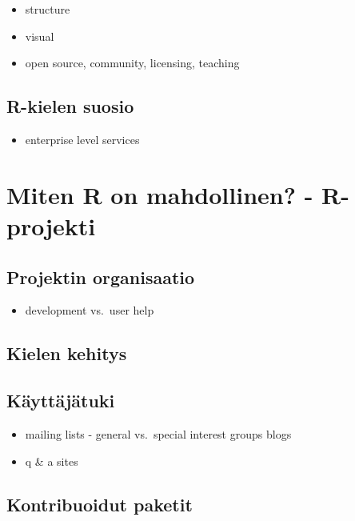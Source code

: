 \begin{itemize}
\itemsep1pt\parskip0pt
\item
  structure
\item
  visual
\item
  open source, community, licensing, teaching
\end{itemize}

\subsection{R-kielen suosio}\label{r-kielen-suosio}

\begin{itemize}
\itemsep1pt\parskip0pt
\item
  enterprise level services
\end{itemize}

\section{Miten R on mahdollinen? -
R-projekti}\label{miten-r-on-mahdollinen---r-projekti}

\subsection{Projektin organisaatio}\label{projektin-organisaatio}

\begin{itemize}
\itemsep1pt\parskip0pt
\item
  development vs.~user help
\end{itemize}

\subsection{Kielen kehitys}\label{kielen-kehitys}

\subsection{Käyttäjätuki}\label{kuxe4yttuxe4juxe4tuki}

\begin{itemize}
\itemsep1pt\parskip0pt
\item
  mailing lists - general vs.~special interest groups blogs
\item
  q \& a sites
\end{itemize}

\subsection{Kontribuoidut paketit}\label{kontribuoidut-paketit}


